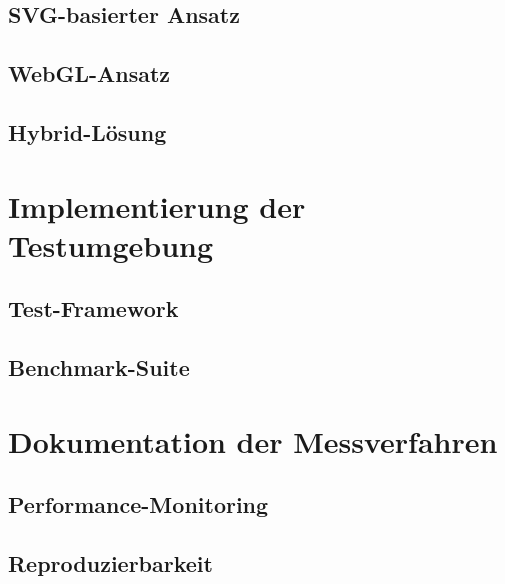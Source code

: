 \subsection{SVG-basierter Ansatz}

\subsection{WebGL-Ansatz}

\subsection{Hybrid-Lösung}

\section{Implementierung der Testumgebung}

\subsection{Test-Framework}

\subsection{Benchmark-Suite}

\section{Dokumentation der Messverfahren}

\subsection{Performance-Monitoring}

\subsection{Reproduzierbarkeit}
